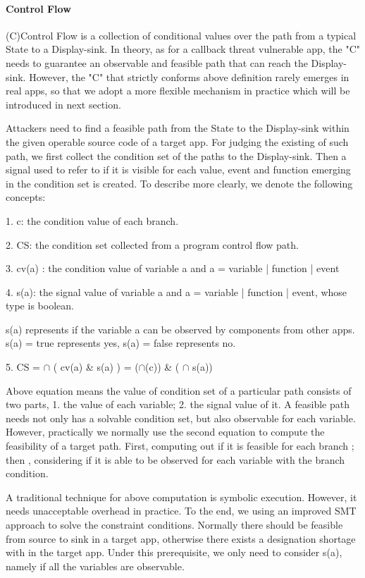 \paragraph{Control Flow}

(C)Control Flow is a collection of conditional values over the path from a typical State to a Display-sink. In theory, as for a callback threat vulnerable app, the "C" needs to guarantee an observable and feasible path that can reach the Display-sink. However, the "C" that strictly conforms above definition rarely emerges in real apps, so that we adopt a more flexible mechanism in practice which will be introduced in next section.  

Attackers need to find a feasible path from the State to the Display-sink within the given operable source code of a target app. For judging the existing of such path, we first collect the condition set of the paths to the Display-sink. Then a signal used to refer to if it is visible for each value, event and function emerging in the condition set is created. To describe more clearly, we denote the following concepts:

1. c: the condition value of each branch.

2. CS: the condition set collected from a program control flow path.

3. cv(a) : the condition value of variable a and a = variable | function | event

4. s(a): the signal value of variable a and a = variable | function | event, whose type is boolean.

s(a) represents if the variable a can be observed by components from other apps. s(a) = true represents yes, s(a) = false represents no.

5. CS = $\cap$ ( cv(a) \& s(a) ) = ($\cap$(c)) \& ( $\cap$ s(a))

Above equation means the value of condition set of a particular path consists of two parts, 1. the value of each variable; 2. the signal value of it. A feasible path needs not only has a solvable condition set, but also observable for each variable. However, practically we normally use the second equation to compute the feasibility of a target path. First, computing out if it is feasible for each branch ; then , considering if it is able to be observed for each variable with the branch condition.

A traditional technique for above computation is symbolic execution. However, it needs unacceptable overhead in practice. {\color {red} To the end, we using an improved SMT approach to solve the constraint conditions.} Normally there should be feasible from source to sink in a target app, otherwise there exists a designation shortage with in the target app. Under this prerequisite, we only need to consider s(a), namely if all the variables are observable. 



